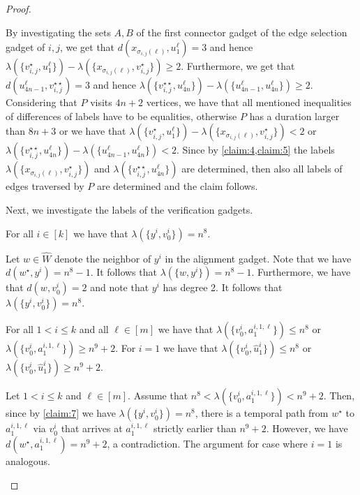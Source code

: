 \documentclass[a4paper,UKenglish,cleveref, autoref, thm-restate, anonymous]{lipics-v2021}
\begin{document}
\begin{proof}
\begin{claimproof}
    By investigating the sets $A,B$ of the first connector gadget of the edge selection gadget of $i,j$, we get that $d(x_{\sigma_{i,j}(\ell)},u^\ell_{1})=3$ and hence $\lambda(\{v_{i,j}^\star,u^\ell_{1}\})-\lambda(\{x_{\sigma_{i,j}(\ell)},v_{i,j}^\star\})\ge 2$. Furthermore, we get that $d(u^\ell_{4n-1},v_{i,j}^{\star\star})=3$ and hence $\lambda(\{v_{i,j}^{\star\star},u^\ell_{4n}\})-\lambda(\{u^\ell_{4n-1},u^\ell_{4n}\})\ge 2$. Considering that $P$ visits $4n+2$ vertices, we have that all mentioned inequalities of differences of labels have to be equalities, otherwise $P$ has a duration larger than $8n+3$ or we have that $\lambda(\{v_{i,j}^\star,u^\ell_{1}\})-\lambda(\{x_{\sigma_{i,j}(\ell)},v_{i,j}^\star\})< 2$ or $\lambda(\{v_{i,j}^{\star\star},u^\ell_{4n}\})-\lambda(\{u^\ell_{4n-1},u^\ell_{4n}\})< 2$. Since by \cref{claim:4,claim:5} the labels $\lambda(\{x_{\sigma_{i,j}(\ell)},v_{i,j}^\star\})$ and $\lambda(\{v_{i,j}^{\star\star},u^\ell_{4n}\})$ are determined, then also all labels of edges traversed by $P$ are determined and the claim follows.
    \end{claimproof}

Next, we investigate the labels of the verification gadgets.

\begin{claim}\label{claim:7}
    For all $i\in[k]$ we have that $\lambda(\{y^i,v_0^i\})=n^8$.
\end{claim}
\begin{claimproof}
    Let $w\in \hat{W}$ denote the neighbor of $y^i$ in the alignment gadget. Note that we have $d(w^\star,y^i)=n^8-1$. It follows that $\lambda(\{w,y^i\})=n^8-1$. Furthermore, we have that $d(w,v_0^i)=2$ and note that $y^i$ has degree 2. It follows that $\lambda(\{y^i,v_0^i\})=n^8$.
\end{claimproof}

\begin{claim}\label{claim:8}
    For all $1<i\le k$ and all $\ell\in[m]$ we have that $\lambda(\{v_0^i,a^{i,1,\ell}_{1}\})\le n^8$ or $\lambda(\{v_0^i,a^{i,1,\ell}_{1}\})\ge n^9+2$.
    For $i=1$ we have that $\lambda(\{v_0^i,\hat{u}^i_1\})\le n^8$ or $\lambda(\{v_0^i,\hat{u}^i_1\})\ge n^9+2$.
\end{claim}
\begin{claimproof}
    Let $1<i\le k$ and $\ell\in[m]$. Assume that $n^8<\lambda(\{v_0^i,a^{i,1,\ell}_{1}\})< n^9+2$. Then, since by \cref{claim:7} we have $\lambda(\{y^i,v_0^i\})=n^8$, there is a temporal path from $w^\star$ to $a^{i,1,\ell}_{1}$ via $v_0^i$ that arrives at $a^{i,1,\ell}_{1}$ strictly earlier than $n^9+2$. However, we have $d(w^\star,a^{i,1,\ell}_{1})=n^9+2$, a contradiction. The argument for case where $i=1$ is analogous.
\end{claimproof}


\end{proof}
\end{document}
